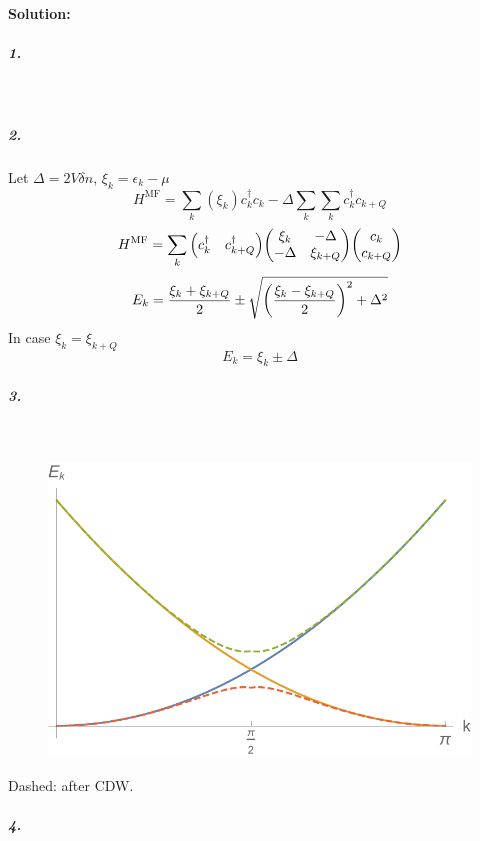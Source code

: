 \documentclass[a4paper]{article}
\DeclareMathOperator{\MF}{\text{MF}}
\numberwithin{equation}{section}
\begin{document}
\paragraph{Solution:}
\subparagraph{1.}
~\vspace{70pt}\\
\subparagraph{2.}
Let $ \Delta = 2V\delta n $, $ \xi_k = \epsilon_k - \mu $
\begin{equation}\label{key}
	H^{\MF} = \sum_k (\xi_k) c_k^\dagger c_k - \Delta \sum_k  \sum_k c_k^\dagger c_{k+Q}
\end{equation}
\begin{equation}\label{key}
	H^{\MF} = \sum_k \mqty(c_k^\dagger & c_{k+Q}^\dagger) 
		\mqty(\xi_k & -\Delta\\ - \Delta & \xi_{k+Q} ) 
		\mqty(c_k \\ c_{k+Q}) 
\end{equation}
\begin{equation}\label{key}
	E_k = \dfrac{\xi_k + \xi_{k+Q}}{2} \pm \sqrt{\qty( \dfrac{\xi_k - \xi_{k+Q}}{2} )^2 + \Delta^2}
\end{equation}
In case $ \xi_k = \xi_{k+Q} $
\begin{equation}\label{key}
	E_k = \xi_k \pm \Delta
\end{equation}
\newpage
\subparagraph{3.}~\\
\begin{figure}[H]
	\includegraphics[width=0.6\linewidth]{Ek.pdf}
\end{figure}
Dashed: after CDW.

\subparagraph{4.}
\end{document}

